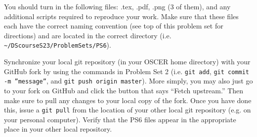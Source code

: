 \documentclass[12pt,english]{exam}
\begin{document}
\begin{questions}
\question You should turn in the following files: .tex, .pdf, .png (3 of them), and any additional scripts required to reproduce your work.  Make sure that these files each have the correct naming convention (see top of this problem set for directions) and are located in the correct directory (i.e. \texttt{\textasciitilde/DScourseS23/ProblemSets/PS6}).

\question Synchronize your local git repository (in your OSCER home directory) with your GitHub fork by using the commands in Problem Set 2 (i.e. \texttt{git add}, \texttt{git commit -m ''message''}, and \texttt{git push origin master}). More simply, you may also just go to your fork on GitHub and click the button that says ``Fetch upstream.'' Then make sure to pull any changes to your local copy of the fork. Once you have done this, issue a \texttt{git pull} from the location of your other local git repository (e.g. on your personal computer). Verify that the PS6 files appear in the appropriate place in your other local repository.

\end{questions}
\end{document}
